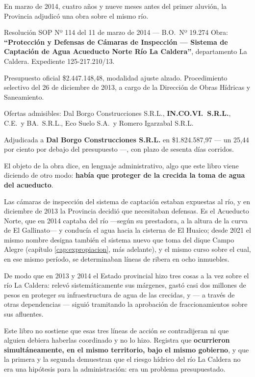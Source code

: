 En marzo de 2014, cuatro años y nueve meses antes del primer aluvión, la Provincia adjudicó una obra sobre el mismo río.

\begin{ficha}{Resolución SOP Nº 114 del 11 de marzo de 2014 --- B.O.\ Nº 19.274}
Obra: \textbf{``Protección y Defensas de Cámaras de Inspección --- Sistema de Captación de Agua Acueducto Norte Río La Caldera''}, departamento La Caldera. Expediente 125-217.210/13.

Presupuesto oficial \$2.447.148,48, modalidad ajuste alzado. Procedimiento selectivo del 26 de diciembre de 2013, a cargo de la Dirección de Obras Hídricas y Saneamiento.

Ofertas admisibles: Dal Borgo Construcciones S.R.L., \textbf{IN.CO.VI.\ S.R.L.}, C.E.\ y BA.\ S.R.L., Eco Suelo S.A.\ y Romero Igarzabal S.R.L.

Adjudicada a \textbf{Dal Borgo Construcciones S.R.L.} en \$1.824.587,97 --- un 25,44 por ciento por debajo del presupuesto ---, con plazo de sesenta días corridos.
\end{ficha}

\begin{cautela}
El objeto de la obra dice, en lenguaje administrativo, algo que este libro viene diciendo de otro modo: \textbf{había que proteger de la crecida la toma de agua del acueducto}.

Las cámaras de inspección del sistema de captación estaban expuestas al río, y en diciembre de 2013 la Provincia decidió que necesitaban defensas. Es el Acueducto Norte, que en 2014 captaba del río ---según su prestadora, a la altura de la curva de El Gallinato--- y conducía el agua hacia la cisterna de El Huaico; desde 2021 el mismo nombre designa también el sistema nuevo que toma del dique Campo Alegre (capítulo \ref{cap:expropiacion}, más adelante), y el mismo curso sobre el cual, en ese mismo período, se determinaban líneas de ribera en ocho inmuebles.

De modo que en 2013 y 2014 el Estado provincial hizo tres cosas a la vez sobre el río La Caldera: relevó sistemáticamente sus márgenes, gastó casi dos millones de pesos en proteger su infraestructura de agua de las crecidas, y --- a través de otras dependencias --- siguió tramitando la aprobación de fraccionamientos sobre sus afluentes.

Este libro no sostiene que esas tres líneas de acción se contradijeran ni que alguien debiera haberlas coordinado y no lo hizo. Registra que \textbf{ocurrieron simultáneamente, en el mismo territorio, bajo el mismo gobierno}, y que la primera y la segunda demuestran que el riesgo hídrico del río La Caldera no era una hipótesis para la administración: era un problema presupuestado.
\end{cautela}

